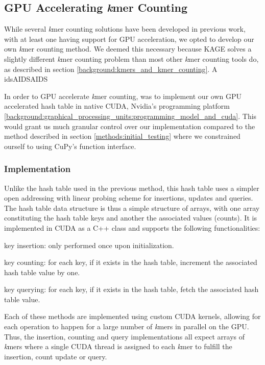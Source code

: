 \subsection{GPU Accelerating \textit{k}mer Counting}
While several \textit{k}mer counting solutions have been developed in previous work, with at least one having support for GPU acceleration, we opted to develop our own \textit{k}mer counting method.
We deemed this necessary because KAGE solves a slightly different \textit{k}mer counting problem than most other \textit{k}mer counting tools do, as described in section \ref{background:kmers_and_kmer_counting}.
A idsAIDSAIDS

In order to GPU accelerate \textit{k}mer counting, was to implement our own GPU accelerated hash table in native CUDA, Nvidia's programming platform \ref{background:graphical_processing_units:programming_model_and_cuda}.
This would grant us much granular control over our implementation compared to the method described in section \ref{methods:initial_testing} where we constrained ourself to using CuPy's function interface.

\subsubsection{Implementation}

Unlike the hash table used in the previous method, this hash table uses a simpler open addressing with linear probing scheme for insertions, updates and queries.
The hash table data structure is thus a simple structure of arrays, with one array constituting the hash table keys and another the associated values (counts).
It is implemented in CUDA as a C++ class and supports the following functionalities:
\begin{compactitem}
  \item key insertion: only performed once upon initialization.
  \item key counting: for each key, if it exists in the hash table, increment the associated hash table value by one.
  \item key querying: for each key, if it exists in the hash table, fetch the associated hash table value.
\end{compactitem}

Each of these methods are implemented using custom CUDA kernels, allowing for each operation to happen for a large number of \textit{k}mers in parallel on the GPU.
Thus, the insertion, counting and query implementations all expect arrays of \textit{k}mers where a single CUDA thread is assigned to each \textit{k}mer to fulfill the insertion, count update or query.

